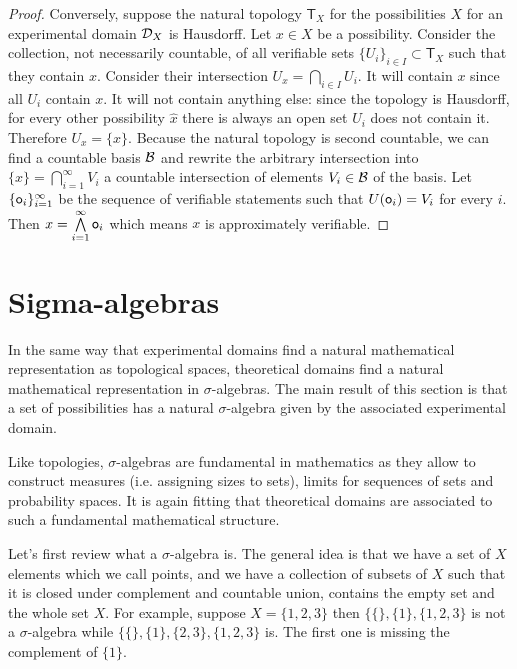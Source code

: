 \documentclass[11pt,letterpaper,fleqn]{memoir} %
\begin{document}
\begin{mathSection}
\begin{proof}
	Conversely, suppose the natural topology $\mathsf{T}_X$ for the possibilities $X$ for an experimental domain $\mathcal{D}_X$ is Hausdorff. Let $x \in X$ be a possibility. Consider the collection, not necessarily countable, of all verifiable sets $\{U_i\}_{i \in I} \subset \mathsf{T}_X$ such that they contain $x$. Consider their intersection $U_x = \bigcap\limits_{i \in I} U_i$. It will contain $x$ since all $U_i$ contain $x$. It will not contain anything else: since the topology is Hausdorff, for every other possibility $\hat{x}$ there is always an open set $U_i$ does not contain it. Therefore $U_x = \{x\}$. Because the natural topology is second countable, we can find a countable basis $\mathcal{B}$ and rewrite the arbitrary intersection into $\{x\} = \bigcap\limits_{i=1}^\infty V_i$ a countable intersection of elements $V_i \in \mathcal{B}$ of the basis. Let $\{\mathsf{o}_i\}_{i=1}^\infty$ be the sequence of verifiable statements such that $U(\mathsf{o}_i) = V_i$ for every $i$. Then $x=\bigwedge\limits_{i=1}^\infty \mathsf{o}_i$ which means $x$ is approximately verifiable.

\end{proof}
\end{mathSection}

\section{Sigma-algebras}

In the same way that experimental domains find a natural mathematical representation as topological spaces, theoretical domains find a natural mathematical representation in $\sigma$-algebras. The main result of this section is that a set of possibilities has a natural $\sigma$-algebra given by the associated experimental domain.

Like topologies, $\sigma$-algebras are fundamental in mathematics as they allow to construct measures (i.e. assigning sizes to sets), limits for sequences of sets and probability spaces. It is again fitting that theoretical domains are associated to such a fundamental mathematical structure.

Let's first review what a $\sigma$-algebra is. The general idea is that we have a set of $X$ elements which we call points, and we have a collection of subsets of $X$ such that it is closed under complement and countable union, contains the empty set and the whole set $X$. For example, suppose $X = \{1,2,3\}$ then  $\{\{\},\{1\},\{1,2,3\}$ is not a $\sigma$-algebra while $\{\{\},\{1\}, \{2,3\},\{1,2,3\}$ is. The first one is missing the complement of $\{1\}$.
\end{document}
